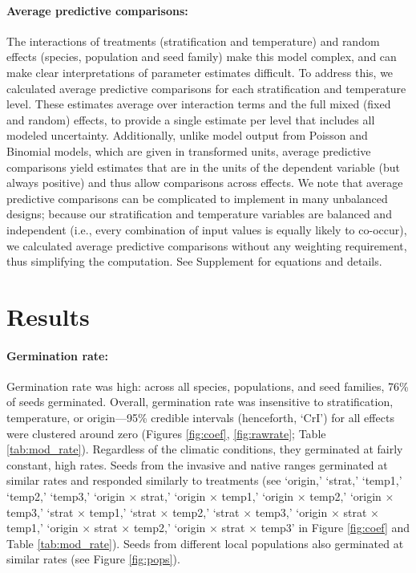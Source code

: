 \documentclass[12pt]{article}\usepackage[]{graphicx}\usepackage[]{color}
\begin{document}
	\paragraph{Average predictive comparisons:} The interactions of treatments (stratification and temperature) and random effects (species, population and seed family) make this model complex, and can make clear interpretations of parameter estimates difficult. To address this, we calculated average predictive comparisons \parencite{Gelman2007} for each stratification and  temperature level. These estimates average over interaction terms and the full mixed (fixed and random) effects, to provide a single estimate per level that includes all modeled uncertainty. Additionally, unlike model output from Poisson and Binomial models, which are given in transformed units, average predictive comparisons yield estimates that are in the units of the dependent variable (but always positive) \parencite{Gelman2007} and thus allow comparisons across effects. We note that average predictive comparisons can be complicated to implement in many unbalanced designs; because our stratification and temperature variables are balanced and independent (i.e., every combination of input values is equally likely to co-occur), we calculated average predictive comparisons without any weighting requirement, thus simplifying the computation. See Supplement for equations and details.

	\section{Results} 
	\paragraph{Germination rate:} Germination rate was high: across all species, populations, and seed families, 76\% of seeds germinated. Overall, germination rate was insensitive to stratification, temperature, or origin---95\% credible intervals (henceforth, `CrI') for all effects were clustered around zero (Figures \ref{fig:coef}, \ref{fig:rawrate}; Table \ref{tab:mod_rate}). Regardless of the climatic conditions, they germinated at fairly constant, high rates. Seeds from the invasive and native ranges germinated at similar rates and responded similarly to treatments (see `origin,' `strat,' `temp1,' `temp2,' `temp3,' `origin $\times$ strat,' `origin $\times$ temp1,' `origin $\times$ temp2,' `origin $\times$ temp3,' `strat $\times$ temp1,' `strat $\times$ temp2,' `strat $\times$ temp3,' `origin $\times$ strat $\times$ temp1,' `origin $\times$ strat $\times$ temp2,' `origin $\times$ strat $\times$ temp3' in Figure \ref{fig:coef} and Table \ref{tab:mod_rate}). Seeds from different local populations also germinated at similar rates (see Figure \ref{fig:pops}).
\end{document}

